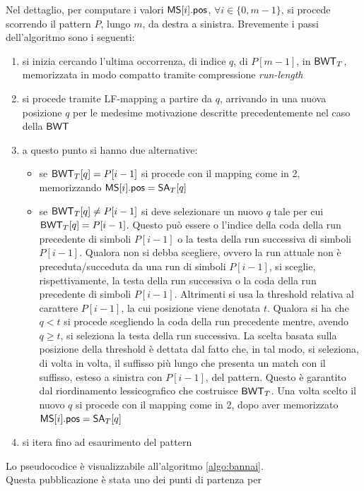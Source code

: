 Nel dettaglio, per computare i valori $\mbox{\rm {\sf MS}}[i].\mbox{\rm {\sf pos}}$, $\forall i\in\{0,m-1\}$,
 si procede scorrendo il
pattern $P$, lungo $m$, da destra a sinistra. Brevemente i passi dell'algoritmo
sono i seguenti: 
\begin{enumerate}
  \item si inizia cercando l'ultima occorrenza, di indice $q$, di $P[m-1]$,
  in $\mbox{\rm {\sf BWT}}_T$, memorizzata in modo
  compatto tramite compressione \textit{run-length}
  \item si procede tramite LF-mapping a partire da $q$, arrivando in
  una nuova posizione $q$ per le medesime motivazione descritte precedentemente
  nel caso della $\mbox{\rm {\sf BWT}}$
  \item a questo punto si hanno due alternative:
  \begin{itemize}
    \item se $\mbox{\rm {\sf BWT}}_T[q]=P[i-1]$ si procede con il mapping come in 2, memorizzando
    $\mbox{\rm {\sf MS}}[i].\mbox{\rm {\sf pos}} = \mbox{\rm {\sf SA}}_T[q]$
    \item se $\mbox{\rm {\sf BWT}}_T[q]\neq P[i-1]$ si deve selezionare un nuovo $q$ tale per cui
    $\mbox{\rm {\sf BWT}}_T[q]=P[i-1]$. Questo può essere o l'indice della coda della run
    precedente di simboli $P[i-1]$ o la testa della run successiva di simboli
    $P[i-1]$. Qualora non si debba scegliere, ovvero la run attuale non è
    preceduta/succeduta da una run di simboli $P[i-1]$, si sceglie,
    rispettivamente, la testa della run successiva o la coda della run
    precedente di simboli $P[i-1]$. Altrimenti si usa la threshold relativa al
    carattere $P[i-1]$, la cui posizione viene denotata $t$. Qualora si ha che
    $q<t$ si procede scegliendo la coda della run precedente mentre, avendo
    $q\geq t$, si seleziona la testa della run successiva. La scelta basata
    sulla posizione della threshold è dettata dal fatto che, in tal modo, si
    seleziona, di volta in volta, il suffisso più lungo che presenta un match
    con il suffisso, esteso a sinistra con $P[i-1]$, del pattern. Questo è
    garantito dal riordinamento lessicografico che costruisce $\mbox{\rm {\sf BWT}}_T$. 
    Una volta
    scelto il nuovo $q$ si procede con il mapping come in 2, dopo aver 
    memorizzato $\mbox{\rm {\sf MS}}[i].\mbox{\rm {\sf pos}} = \mbox{\rm {\sf SA}}_T[q]$
  \end{itemize}
  \item si itera fino ad esaurimento del pattern
\end{enumerate}
Lo pseudocodice è visualizzabile all'algoritmo \ref{algo:bannai}.\\
Questa pubblicazione è stata uno dei punti di partenza per

